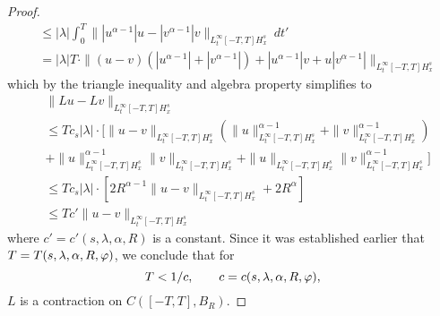 \begin{proof}
\begin{equation*}
\begin{split}
    & \le |\lambda| \int_0^T \||u^{\alpha-1 }| u - | v^{\alpha - 1}| v
    \|_{L^\infty_t[-T, T] H^s_x} \ dt'
    \\
    & = |\lambda| T \cdot \|(u-v)(|u^{\alpha -1}| + |v^{\alpha -1}|) 
    + |u^{\alpha -1}|v 
    + u |v^{\alpha -1}| \|_{L^\infty_t[-T, T] H^s_x}
  \end{split}
\end{equation*}
%
%
which by the triangle inequality and algebra property simplifies to
%
%
\begin{equation}
  \label{L-contract}
  \begin{split}
    & \|Lu-Lv\|_{L^\infty_t[-T, T] H^s_x}
    \\
    & \le  T c_s |\lambda| \cdot \big [ \|u-v\|_{L^\infty_t[-T, T]
    H^s_x}(\|u\|^{\alpha -1}_{L^\infty_t[-T, T] H^s_x} +
    \|v\|^{\alpha -1}_{L^\infty_t[-T, T] H^s_x})
    \\
    & + \|u\|^{\alpha-1}_
    {L^\infty_t[-T, T] H^s_x} \|v\|_{L^\infty_t[-T, T] H^s_x}
    + \|u\|_
    {L^\infty_t[-T, T] H^s_x} \|v\|^{\alpha -1}_
    {L^\infty_t[-T, T] H^s_x} \big ]
    \\
    & \le T c_s |\lambda| \cdot \left[  2R^{\alpha -1} 
    \|u -v\|_{L^\infty_t[-T, T] H^s_x} + 2R^{\alpha} \right]
    \\
    & \le T c' \|u -v \|_{L^\infty_t[-T, T] 
    H^s_x}
  \end{split}
\end{equation}
%
%
where $c' = c'(s, \lambda, \alpha, R)$ is a constant.
Since it was established earlier that $T = T(s, \lambda, \alpha, R, \varphi)$,  
we conclude that for $$T < 1/c,  \qquad c = c(s, \lambda, \alpha, R, 
\varphi),$$ $L$ is a 
contraction on $C([-T, T], B_R)$. 
\end{proof}

